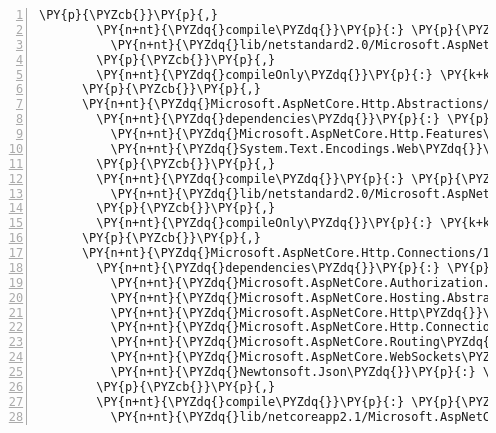 \begin{Verbatim}[commandchars=\\\{\},numbers=left,firstnumber=1,stepnumber=1,numberblanklines=0]
        \PY{p}{\PYZcb{}}\PY{p}{,}
        \PY{n+nt}{\PYZdq{}compile\PYZdq{}}\PY{p}{:} \PY{p}{\PYZob{}}
          \PY{n+nt}{\PYZdq{}lib/netstandard2.0/Microsoft.AspNetCore.Http.dll\PYZdq{}}\PY{p}{:} \PY{p}{\PYZob{}}\PY{p}{\PYZcb{}}
        \PY{p}{\PYZcb{}}\PY{p}{,}
        \PY{n+nt}{\PYZdq{}compileOnly\PYZdq{}}\PY{p}{:} \PY{k+kc}{true}
      \PY{p}{\PYZcb{}}\PY{p}{,}
      \PY{n+nt}{\PYZdq{}Microsoft.AspNetCore.Http.Abstractions/2.1.0\PYZhy{}rc1\PYZhy{}final\PYZdq{}}\PY{p}{:} \PY{p}{\PYZob{}}
        \PY{n+nt}{\PYZdq{}dependencies\PYZdq{}}\PY{p}{:} \PY{p}{\PYZob{}}
          \PY{n+nt}{\PYZdq{}Microsoft.AspNetCore.Http.Features\PYZdq{}}\PY{p}{:} \PY{l+s+s2}{\PYZdq{}2.1.0\PYZhy{}rc1\PYZhy{}final\PYZdq{}}\PY{p}{,}
          \PY{n+nt}{\PYZdq{}System.Text.Encodings.Web\PYZdq{}}\PY{p}{:} \PY{l+s+s2}{\PYZdq{}4.5.0\PYZhy{}rc1\PYZdq{}}
        \PY{p}{\PYZcb{}}\PY{p}{,}
        \PY{n+nt}{\PYZdq{}compile\PYZdq{}}\PY{p}{:} \PY{p}{\PYZob{}}
          \PY{n+nt}{\PYZdq{}lib/netstandard2.0/Microsoft.AspNetCore.Http.Abstractions.dll\PYZdq{}}\PY{p}{:} \PY{p}{\PYZob{}}\PY{p}{\PYZcb{}}
        \PY{p}{\PYZcb{}}\PY{p}{,}
        \PY{n+nt}{\PYZdq{}compileOnly\PYZdq{}}\PY{p}{:} \PY{k+kc}{true}
      \PY{p}{\PYZcb{}}\PY{p}{,}
      \PY{n+nt}{\PYZdq{}Microsoft.AspNetCore.Http.Connections/1.0.0\PYZhy{}rc1\PYZhy{}final\PYZdq{}}\PY{p}{:} \PY{p}{\PYZob{}}
        \PY{n+nt}{\PYZdq{}dependencies\PYZdq{}}\PY{p}{:} \PY{p}{\PYZob{}}
          \PY{n+nt}{\PYZdq{}Microsoft.AspNetCore.Authorization.Policy\PYZdq{}}\PY{p}{:} \PY{l+s+s2}{\PYZdq{}2.1.0\PYZhy{}rc1\PYZhy{}final\PYZdq{}}\PY{p}{,}
          \PY{n+nt}{\PYZdq{}Microsoft.AspNetCore.Hosting.Abstractions\PYZdq{}}\PY{p}{:} \PY{l+s+s2}{\PYZdq{}2.1.0\PYZhy{}rc1\PYZhy{}final\PYZdq{}}\PY{p}{,}
          \PY{n+nt}{\PYZdq{}Microsoft.AspNetCore.Http\PYZdq{}}\PY{p}{:} \PY{l+s+s2}{\PYZdq{}2.1.0\PYZhy{}rc1\PYZhy{}final\PYZdq{}}\PY{p}{,}
          \PY{n+nt}{\PYZdq{}Microsoft.AspNetCore.Http.Connections.Common\PYZdq{}}\PY{p}{:} \PY{l+s+s2}{\PYZdq{}1.0.0\PYZhy{}rc1\PYZhy{}final\PYZdq{}}\PY{p}{,}
          \PY{n+nt}{\PYZdq{}Microsoft.AspNetCore.Routing\PYZdq{}}\PY{p}{:} \PY{l+s+s2}{\PYZdq{}2.1.0\PYZhy{}rc1\PYZhy{}final\PYZdq{}}\PY{p}{,}
          \PY{n+nt}{\PYZdq{}Microsoft.AspNetCore.WebSockets\PYZdq{}}\PY{p}{:} \PY{l+s+s2}{\PYZdq{}2.1.0\PYZhy{}rc1\PYZhy{}final\PYZdq{}}\PY{p}{,}
          \PY{n+nt}{\PYZdq{}Newtonsoft.Json\PYZdq{}}\PY{p}{:} \PY{l+s+s2}{\PYZdq{}11.0.2\PYZdq{}}
        \PY{p}{\PYZcb{}}\PY{p}{,}
        \PY{n+nt}{\PYZdq{}compile\PYZdq{}}\PY{p}{:} \PY{p}{\PYZob{}}
          \PY{n+nt}{\PYZdq{}lib/netcoreapp2.1/Microsoft.AspNetCore.Http.Connections.dll\PYZdq{}}\PY{p}{:} \PY{p}{\PYZob{}}\PY{p}{\PYZcb{}}

\end{Verbatim}
